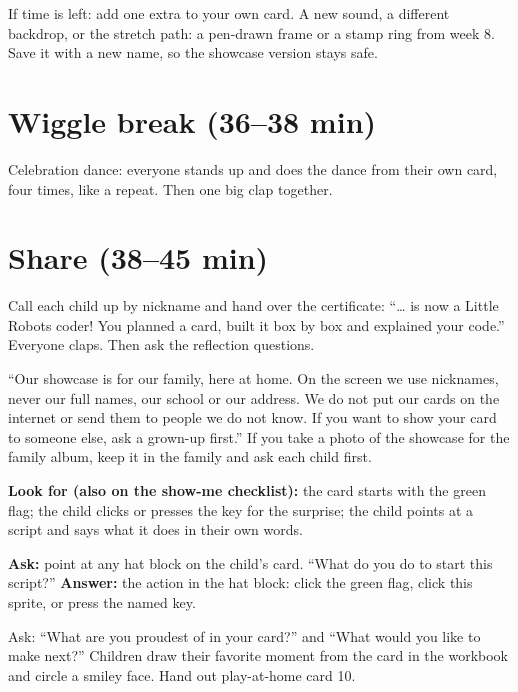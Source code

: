 \begin{freebuild}
If time is left: add one extra to your own card. A new sound, a different backdrop, or the stretch path: a pen-drawn frame or a stamp ring from week 8. Save it with a new name, so the showcase version stays safe.
\end{freebuild}

\section{Wiggle break (36--38 min)}
Celebration dance: everyone stands up and does the dance from their own card, four times, like a repeat. Then one big clap together.

\section{Share (38--45 min)}
\begin{teacherscript}
Call each child up by nickname and hand over the certificate: \enquote{\ldots{} is now a Little Robots coder! You planned a card, built it box by box and explained your code.} Everyone claps. Then ask the reflection questions.
\end{teacherscript}

\begin{safety}
\enquote{Our showcase is for our family, here at home. On the screen we use nicknames, never our full names, our school or our address. We do not put our cards on the internet or send them to people we do not know. If you want to show your card to someone else, ask a grown-up first.} If you take a photo of the showcase for the family album, keep it in the family and ask each child first.
\end{safety}

\begin{formativecheck}
\textbf{Look for (also on the show-me checklist):} the card starts with the green flag; the child clicks or presses the key for the surprise; the child points at a script and says what it does in their own words.

\textbf{Ask:} point at any hat block on the child's card. \enquote{What do you do to start this script?}
\textbf{Answer:} the action in the hat block: click the green flag, click this sprite, or press the named key.
\end{formativecheck}

\begin{reflection}
Ask: \enquote{What are you proudest of in your card?} and \enquote{What would you like to make next?} Children draw their favorite moment from the card in the workbook and circle a smiley face. Hand out play-at-home card 10.
\end{reflection}

